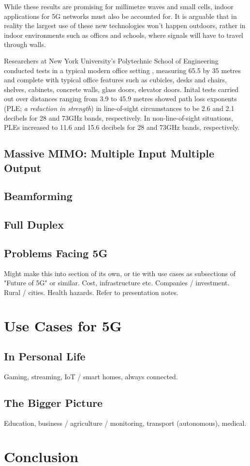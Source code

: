 \documentclass[journal]{IEEEtran}
\begin{document}
While these results are promising for millimetre waves and small cells, indoor applications for 5G networks must also be accounted for. It is arguable that in reality the largest use of these new technologies won't happen outdoors, rather in indoor environments such as offices and schools, where signals will have to travel through walls. 

Researchers at New York University's Polytechnic School of Engineering conducted tests in a typical modern office setting \cite{28_73ghz}, measuring 65.5 by 35 metres and complete with typical office features such as cubicles, desks and chairs, shelves, cabinets, concrete walls, glass doors, elevator doors. Inital tests carried out over distances ranging from 3.9 to 45.9 metres showed path loss exponents (PLE; \textit{a reduction in strength}) in line-of-sight circumstances to be 2.6 and 2.1 decibels for 28 and 73GHz bands, respectively. In non-line-of-sight situations, PLEs increased to 11.6 and 15.6 decibels for 28 and 73GHz bands, respectively. 


\subsection{Massive MIMO: Multiple Input Multiple Output}
\subsection{Beamforming}
\subsection{Full Duplex}
\subsection{Problems Facing 5G}
Might make this into section of its own, or tie with use cases as subsections of "Future of 5G" or similar.
Cost, infrastructure etc. Companies / investment. Rural / cities. Health hazards. Refer to presentation notes.

\section{Use Cases for 5G}
\subsection{In Personal Life}
Gaming, streaming, IoT / smart homes, always connected.
\subsection{The Bigger Picture}
Education, business / agriculture / monitoring, transport (autonomous), medical.

\section{Conclusion}

\printbibliography
\end{document}
